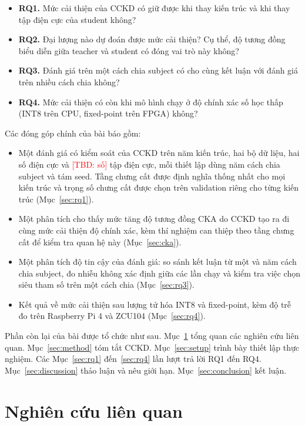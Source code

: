 \documentclass[10pt]{article} %
\newcommand{\tbd}[1]{\textcolor{red}{[TBD: #1]}}
\begin{document}
\begin{itemize}
    \item \textbf{RQ1.} Mức cải thiện của CCKD có giữ được khi thay kiến trúc và khi thay tập điện cực của student không?
    \item \textbf{RQ2.} Đại lượng nào dự đoán được mức cải thiện? Cụ thể, độ tương đồng biểu diễn giữa teacher và student có đóng vai trò này không?
    \item \textbf{RQ3.} Đánh giá trên một cách chia subject có cho cùng kết luận với đánh giá trên nhiều cách chia không?
    \item \textbf{RQ4.} Mức cải thiện có còn khi mô hình chạy ở độ chính xác số học thấp (INT8 trên CPU, fixed-point trên FPGA) không?
\end{itemize}

Các đóng góp chính của bài báo gồm:

\begin{itemize}
    \item Một đánh giá có kiểm soát của CCKD trên năm kiến trúc, hai bộ dữ liệu, hai số điện cực và \tbd{số} tập điện cực, mỗi thiết lập dùng năm cách chia subject và tám seed. Tầng chưng cất được định nghĩa thống nhất cho mọi kiến trúc và trọng số chưng cất được chọn trên validation riêng cho từng kiến trúc (Mục~\ref{sec:rq1}).
    \item Một phân tích cho thấy mức tăng độ tương đồng CKA do CCKD tạo ra đi cùng mức cải thiện độ chính xác, kèm thí nghiệm can thiệp theo tầng chưng cất để kiểm tra quan hệ này (Mục~\ref{sec:cka}).
    \item Một phân tích độ tin cậy của đánh giá: so sánh kết luận từ một và năm cách chia subject, đo nhiễu không xác định giữa các lần chạy và kiểm tra việc chọn siêu tham số trên một cách chia (Mục~\ref{sec:rq3}).
    \item Kết quả về mức cải thiện sau lượng tử hóa INT8 và fixed-point, kèm độ trễ đo trên Raspberry Pi 4 và ZCU104 (Mục~\ref{sec:rq4}).
\end{itemize}

Phần còn lại của bài được tổ chức như sau. Mục~\ref{sec:related} tổng quan các nghiên cứu liên quan. Mục~\ref{sec:method} tóm tắt CCKD. Mục~\ref{sec:setup} trình bày thiết lập thực nghiệm. Các Mục~\ref{sec:rq1} đến~\ref{sec:rq4} lần lượt trả lời RQ1 đến RQ4. Mục~\ref{sec:discussion} thảo luận và nêu giới hạn. Mục~\ref{sec:conclusion} kết luận.

\section{Nghiên cứu liên quan}
\label{sec:related}
\end{document}
